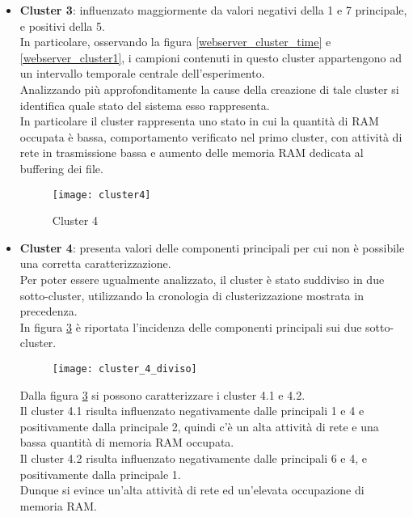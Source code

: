 \begin{itemize}
  \clearpage

  \begin{figure}[!htbp]
    \centering
    \texttt{[image: cluster3]}
    \caption{Cluster 3}
    \label{webserver_cluster3}
  \end{figure}

  \item \textbf{Cluster 3}: influenzato maggiormente da valori negativi della
  1 e 7 principale, e positivi della 5.\\
  In particolare, osservando la figura \ref{webserver_cluster_time} e \ref{webserver_cluster1}, i campioni contenuti
  in questo cluster appartengono ad un intervallo temporale centrale dell'esperimento.\\
  Analizzando più approfonditamente la cause della creazione di tale cluster si
  identifica quale stato del sistema esso rappresenta.\\
  In particolare il cluster rappresenta uno stato in cui la quantità di RAM occupata
  è bassa, comportamento verificato nel primo cluster, con attività di rete in trasmissione
  bassa e aumento delle memoria RAM dedicata al buffering dei file.

  \clearpage

  \begin{figure}[!htbp]
    \centering
    \texttt{[image: cluster4]}
    \caption{Cluster 4}
    \label{webserver_cluster4}
  \end{figure}

  \item \textbf{Cluster 4}: presenta valori delle componenti principali per cui non
  è possibile una corretta caratterizzazione.\\
  Per poter essere ugualmente analizzato, il cluster è stato suddiviso in due
  sotto-cluster, utilizzando la cronologia di clusterizzazione mostrata in
  precedenza.\\
  In figura \ref{webserver_cluster_4_diviso} è riportata l'incidenza delle componenti
  principali sui due sotto-cluster.\\

  \begin{figure}[!htbp]
    \centering
    \texttt{[image: cluster\_4\_diviso]}
    \caption{}
    \label{webserver_cluster_4_diviso}
  \end{figure}

  Dalla figura \ref{webserver_cluster_4_diviso} si possono caratterizzare i cluster 4.1 e 4.2.\\
  Il cluster 4.1 risulta influenzato  negativamente dalle principali 1 e 4
  e positivamente dalla principale 2, quindi c'è un alta attività di rete
  e una bassa quantità di memoria RAM occupata.\\
  Il cluster 4.2 risulta influenzato negativamente dalle principali 6 e 4,
  e positivamente dalla principale 1.\\
  Dunque si evince un'alta attività di rete ed un'elevata occupazione di memoria
  RAM.\\


\end{itemize}
